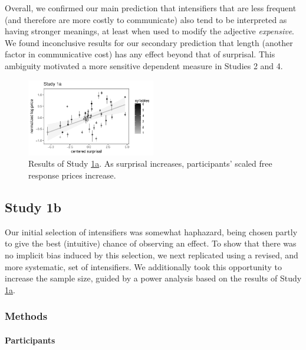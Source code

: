 \documentclass[10pt,letterpaper]{article}
\begin{document}
Overall, we confirmed our main prediction that intensifiers that are less frequent (and therefore are more costly to communicate) also tend to be interpreted as having stronger meanings, at least when used to modify the adjective \emph{expensive}.
We found inconclusive results for our secondary prediction that length (another factor in communicative cost) has any effect beyond that of surprisal.
This ambiguity motivated a more sensitive dependent measure in Studies 2 and 4.

\begin{figure}[ht]
\begin{center}
\includegraphics[width=0.5\textwidth]{images/plot_study1a.pdf}
\end{center}
\caption{Results of Study \hyperref[sec:study1a]{1a}. As surprisal increases, participants' scaled free response prices increase.} 
\label{fig:plot_study1a}
\end{figure}

\subsection{Study 1b \label{sec:study1b}}

Our initial selection of intensifiers was somewhat haphazard, being chosen partly to give the best (intuitive) chance of observing an effect. 
To show that there was no implicit bias induced by this selection, we next replicated using a revised, and more systematic, set of intensifiers.
We additionally took this opportunity to increase the sample size, guided by a power analysis based on the results of Study \hyperref[sec:study1a]{1a}.

\subsubsection{Methods}

\paragraph{Participants}
\end{document}
